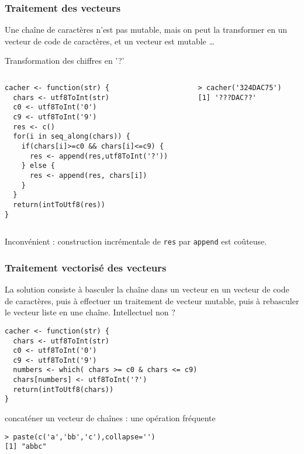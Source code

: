 \documentclass[10pt]{beamer}
\begin{document}
\begin{frame}[fragile]
  \frametitle{Traitement des vecteurs}
  Une chaîne de caractères n’est pas mutable, mais on peut la transformer en un vecteur de code de caractères, et un vecteur est mutable \dots
  \begin{exampleblock}{Transformation des chiffres en '?'}
    
\begin{columns}[c]
\begin{column}{0.66\textwidth}
    \begin{lstlisting}[style=edblock]
cacher <- function(str) {
  chars <- utf8ToInt(str)
  c0 <- utf8ToInt('0')
  c9 <- utf8ToInt('9')
  res <- c()
  for(i in seq_along(chars)) {
    if(chars[i]>=c0 && chars[i]<=c9) {
      res <- append(res,utf8ToInt('?'))
    } else {
      res <- append(res, chars[i])
    }
  }
  return(intToUtf8(res))
}      
\end{lstlisting}

\end{column}
\begin{column}{0.34\textwidth}
  \begin{lstlisting}
> cacher('324DAC75')
[1] '???DAC??'    
\end{lstlisting}


\end{column}
\end{columns}
\alert{Inconvénient : construction incrémentale de \texttt{res} par \texttt{append} est coûteuse.}
  \end{exampleblock}
\end{frame}



\begin{frame}[fragile]
  \frametitle{Traitement vectorisé des vecteurs }
  La solution consiste à basculer la chaîne dans un vecteur en un vecteur de code de caractères, puis à effectuer un \alert{traitement de vecteur mutable}, puis à rebasculer le vecteur liste en une chaîne. Intellectuel non ?

  \begin{lstlisting}[style=editor]
cacher <- function(str) {
  chars <- utf8ToInt(str)
  c0 <- utf8ToInt('0')
  c9 <- utf8ToInt('9')
  numbers <- which( chars >= c0 & chars <= c9)
  chars[numbers] <- utf8ToInt('?')
  return(intToUtf8(chars))
}    
\end{lstlisting}

\begin{exampleblock}{concaténer un vecteur de chaînes : une opération fréquente}
\begin{lstlisting}[style=block]
> paste(c('a','bb','c'),collapse='')
[1] "abbc"  
\end{lstlisting}
  
\end{exampleblock}
\end{frame}




\end{document}
